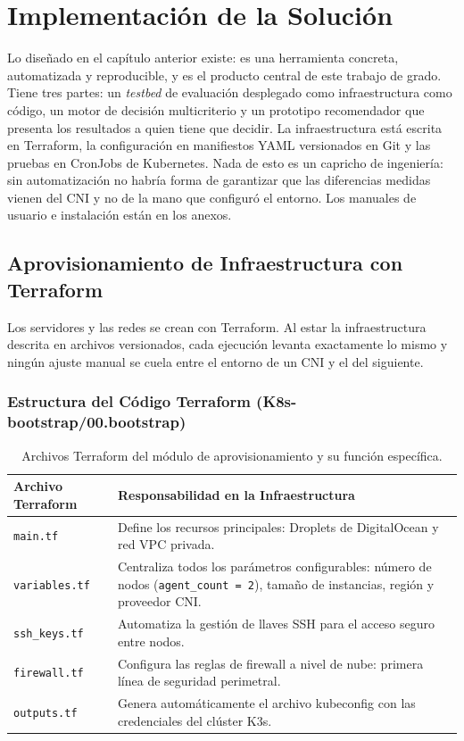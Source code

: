 \chapter{Implementación de la Solución} \label{cap:herramienta}

Lo diseñado en el capítulo anterior existe: es una herramienta concreta, automatizada y reproducible, y es el producto central de este trabajo de grado. Tiene tres partes: un \emph{testbed} de evaluación desplegado como infraestructura como código, un motor de decisión multicriterio y un prototipo recomendador que presenta los resultados a quien tiene que decidir. La infraestructura está escrita en Terraform, la configuración en manifiestos YAML versionados en Git y las pruebas en CronJobs de Kubernetes. Nada de esto es un capricho de ingeniería: sin automatización no habría forma de garantizar que las diferencias medidas vienen del CNI y no de la mano que configuró el entorno. Los manuales de usuario e instalación están en los anexos.

\section{Aprovisionamiento de Infraestructura con Terraform}

Los servidores y las redes se crean con Terraform. Al estar la infraestructura descrita en archivos versionados, cada ejecución levanta exactamente lo mismo y ningún ajuste manual se cuela entre el entorno de un CNI y el del siguiente.

\subsection{Estructura del Código Terraform (K8s-bootstrap/00.bootstrap)}

\begin{table}[htbp]
\centering
\scriptsize
\renewcommand{\arraystretch}{1.25}
\setlength{\tabcolsep}{4pt}
\caption{Archivos Terraform del módulo de aprovisionamiento y su función específica.}
\label{tab:terraform-aprovisionamiento}
\begin{tabularx}{\textwidth}{|l|Y|}
\hline
\textbf{Archivo Terraform} & \textbf{Responsabilidad en la Infraestructura} \\
\hline
\texttt{main.tf} & Define los recursos principales: Droplets de DigitalOcean y red VPC privada. \\
\hline
\texttt{variables.tf} & Centraliza todos los parámetros configurables: número de nodos (\texttt{agent\_count = 2}), tamaño de instancias, región y proveedor CNI. \\
\hline
\texttt{ssh\_keys.tf} & Automatiza la gestión de llaves SSH para el acceso seguro entre nodos. \\
\hline
\texttt{firewall.tf} & Configura las reglas de firewall a nivel de nube: primera línea de seguridad perimetral. \\
\hline
\texttt{outputs.tf} & Genera automáticamente el archivo kubeconfig con las credenciales del clúster K3s. \\
\hline
\end{tabularx}
\end{table}

